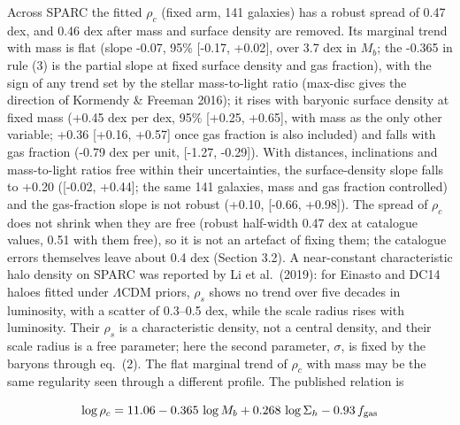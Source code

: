 \documentclass[
  10pt,
]{article}
\begin{document}
Across SPARC the fitted $\rho_c$ (fixed arm, 141 galaxies) has a robust spread of 0.47 dex, and 0.46 dex after mass and surface density are removed. Its marginal trend with mass is flat (slope -0.07, 95\% {[}-0.17, +0.02{]}, over 3.7 dex in $M_b$; the -0.365 in rule (3) is the partial slope at fixed surface density and gas fraction), with the sign of any trend set by the stellar mass-to-light ratio (max-disc gives the direction of Kormendy \& Freeman 2016); it rises with baryonic surface density at fixed mass (+0.45 dex per dex, 95\% {[}+0.25, +0.65{]}, with mass as the only other variable; +0.36 {[}+0.16, +0.57{]} once gas fraction is also included) and falls with gas fraction (-0.79 dex per unit, {[}-1.27, -0.29{]}). With distances, inclinations and mass-to-light ratios free within their uncertainties, the surface-density slope falls to +0.20 ({[}-0.02, +0.44{]}; the same 141 galaxies, mass and gas fraction controlled) and the gas-fraction slope is not robust (+0.10, {[}-0.66, +0.98{]}). The spread of $\rho_c$ does not shrink when they are free (robust half-width 0.47 dex at catalogue values, 0.51 with them free), so it is not an artefact of fixing them; the catalogue errors themselves leave about 0.4 dex (Section 3.2). A near-constant characteristic halo density on SPARC was reported by Li et al.~(2019): for Einasto and DC14 haloes fitted under $\Lambda$CDM priors, $\rho_s$ shows no trend over five decades in luminosity, with a scatter of 0.3--0.5 dex, while the scale radius rises with luminosity. Their $\rho_s$ is a characteristic density, not a central density, and their scale radius is a free parameter; here the second parameter, $\sigma$, is fixed by the baryons through eq.~(2). The flat marginal trend of $\rho_c$ with mass may be the same regularity seen through a different profile. The published
relation is

\begin{equation}
\log\rho_c = 11.06 - 0.365\,\log M_b + 0.268\,\log\Sigma_h - 0.93\,f_{\rm gas}
\end{equation}
\end{document}
